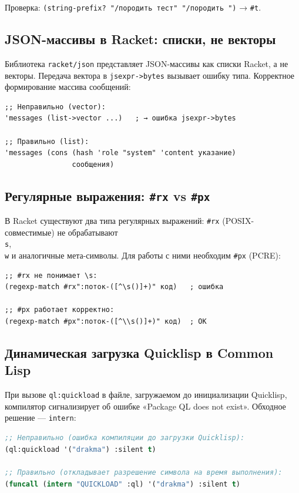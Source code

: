 \documentclass[11pt,a4paper]{article}
\begin{document}
Проверка: \texttt{(string-prefix? "/породить тест" "/породить ")} → \texttt{\#t}.

\subsection{JSON-массивы в Racket: списки, не векторы}

Библиотека \texttt{racket/json} представляет JSON-массивы как списки Racket,
а не векторы. Передача вектора в \texttt{jsexpr->bytes} вызывает ошибку типа.
Корректное формирование массива сообщений:

\begin{lstlisting}[language=Racket, caption={Правильное формирование JSON-массива}]
;; Неправильно (vector):
'messages (list->vector ...)   ; → ошибка jsexpr->bytes

;; Правильно (list):
'messages (cons (hash 'role "system" 'content указание)
                сообщения)
\end{lstlisting}

\subsection{Регулярные выражения: \texttt{\#rx} vs \texttt{\#px}}

В Racket существуют два типа регулярных выражений:
\texttt{\#rx} (POSIX-совместимые) не обрабатывают \texttt{\\s}, \texttt{\\w} и
аналогичные мета-символы. Для работы с ними необходим \texttt{\#px} (PCRE):

\begin{lstlisting}[language=Racket]
;; #rx не понимает \s:
(regexp-match #rx":поток-([^\s()]+)" код)   ; ошибка

;; #px работает корректно:
(regexp-match #px":поток-([^\\s()]+)" код)  ; OK
\end{lstlisting}

\subsection{Динамическая загрузка Quicklisp в Common Lisp}

При вызове \texttt{ql:quickload} в файле, загружаемом до инициализации Quicklisp,
компилятор сигнализирует об ошибке «Package QL does not exist». Обходное решение —
\texttt{intern}:

\begin{lstlisting}[language=CommonLisp, caption={Безопасная загрузка через intern}]
;; Неправильно (ошибка компиляции до загрузки Quicklisp):
(ql:quickload '("drakma") :silent t)

;; Правильно (откладывает разрешение символа на время выполнения):
(funcall (intern "QUICKLOAD" :ql) '("drakma") :silent t)
\end{lstlisting}
\end{document}
